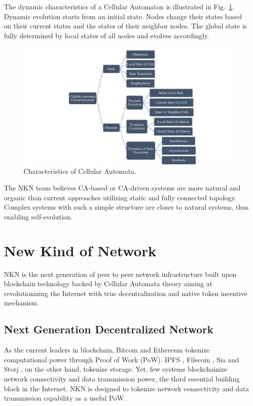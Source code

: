 \documentclass[reprint,pre,aps]{revtex4-1}
\begin{document}
The dynamic characteristics of a Cellular Automaton is illustrated in Fig.~\ref{fig:ca_characteristics}. Dynamic evolution starts from an initial state. Nodes change their states based on their current states and the states of their neighbor nodes. The global state is fully determined by local states of all nodes and evolves accordingly. 

\begin{figure}[!htp]
\centering
\includegraphics[width=\linewidth]{fig/ca_characteristics}
\caption{Characteristics of Cellular Automata.}
\label{fig:ca_characteristics}
\end{figure}

The NKN team believes CA-based or CA-driven systems are more natural and organic than current approaches utilizing static and fully connected topology. Complex systems with such a simple structure are closer to natural systems, thus enabling self-evolution.

\section{New Kind of Network}

NKN is the next generation of peer to peer network infrastructure built upon blockchain technology backed by Cellular Automata theory aiming at revolutionizing the Internet with true decentralization and native token incentive mechanism.

\subsection{Next Generation Decentralized Network}

As the current leaders in blockchain, Bitcoin and Ethereum tokenize computational power through Proof of Work (PoW). IPFS \cite{benet2014ipfs}, Filecoin \cite{filecoin}, Sia \cite{vorick2014sia} and Storj \cite{wilkinson2014storj}, on the other hand, tokenize storage. Yet, few systems blockchainize network connectivity and data transmission power, the third essential building block in the Internet. NKN is designed to tokenize network connectivity and data transmission capability as a useful PoW.
\end{document}
